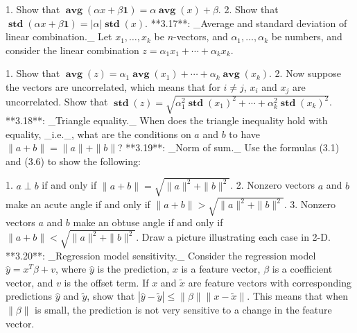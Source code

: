 1. Show that \(\operatorname{\mathbf{avg}}(\alpha x+\beta\mathbf{1})=\alpha\operatorname{ \mathbf{avg}}(x)+\beta\).
2. Show that \(\operatorname{\mathbf{std}}(\alpha x+\beta\mathbf{1})=|\alpha|\operatorname{ \mathbf{std}}(x)\).
**3.17**: _Average and standard deviation of linear combination._ Let \(x_{1},\ldots,x_{k}\) be \(n\)-vectors, and \(\alpha_{1},\ldots,\alpha_{k}\) be numbers, and consider the linear combination \(z=\alpha_{1}x_{1}+\cdots+\alpha_{k}x_{k}\).

1. Show that \(\operatorname{\mathbf{avg}}(z)=\alpha_{1}\operatorname{\mathbf{avg}}(x_{1})+ \cdots+\alpha_{k}\operatorname{\mathbf{avg}}(x_{k})\).
2. Now suppose the vectors are uncorrelated, which means that for \(i\neq j\), \(x_{i}\) and \(x_{j}\) are uncorrelated. Show that \(\operatorname{\mathbf{std}}(z)=\sqrt{\alpha_{1}^{2}\operatorname{\mathbf{std} }(x_{1})^{2}+\cdots+\alpha_{k}^{2}\operatorname{\mathbf{std}}(x_{k})^{2}}\).
**3.18**: _Triangle equality._ When does the triangle inequality hold with equality, _i.e._, what are the conditions on \(a\) and \(b\) to have \(\|a+b\|=\|a\|+\|b\|\)?
**3.19**: _Norm of sum._ Use the formulas (3.1) and (3.6) to show the following:

1. \(a\perp b\) if and only if \(\|a+b\|=\sqrt{\|a\|^{2}+\|b\|^{2}}\).
2. Nonzero vectors \(a\) and \(b\) make an acute angle if and only if \(\|a+b\|>\sqrt{\|a\|^{2}+\|b\|^{2}}\).
3. Nonzero vectors \(a\) and \(b\) make an obtuse angle if and only if \(\|a+b\|<\sqrt{\|a\|^{2}+\|b\|^{2}}\). Draw a picture illustrating each case in 2-D.
**3.20**: _Regression model sensitivity._ Consider the regression model \(\hat{y}=x^{T}\beta+v\), where \(\hat{y}\) is the prediction, \(x\) is a feature vector, \(\beta\) is a coefficient vector, and \(v\) is the offset term. If \(x\) and \(\tilde{x}\) are feature vectors with corresponding predictions \(\hat{y}\) and \(\tilde{y}\), show that \(|\hat{y}-\tilde{y}|\leq\|\beta\|\|x-\tilde{x}\|\). This means that when \(\|\beta\|\) is small, the prediction is not very sensitive to a change in the feature vector.

